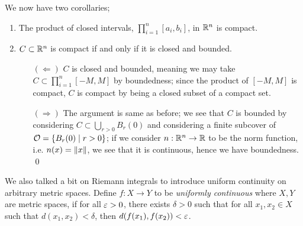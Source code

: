 We now have two corollaries;
\begin{enumerate}[label=(\alph*)]
    \item The product of closed intervals, $\prod_{i=1}^n [a_i, b_i]$, in $\mathbb R^n$ is compact.
    \item $C \subset \mathbb R^n$ is compact if and only if it is closed and bounded.
    \begin{itemize}
        \item[$(\Leftarrow)$] $C$ is closed and bounded, meaning we may take $C \subset \prod_{i=1}^n [-M, M]$ by boundedness; since the product of $[-M, M]$ is compact, $C$ is compact by being a closed subset of a compact set.
        \item[$(\Rightarrow)$] The argument is same as before; we see that $C$ is bounded by considering $C \subset \bigcup_{r > 0} B_r(0)$ and considering a finite subcover of $\mathcal O = \{B_r(0) \mid r > 0\}$; if we consider $n : \mathbb R^n \to \mathbb R$ to be the norm function, i.e. $n(x) = \left\lVert x \right\rVert$, we see that it is continuous, hence we have boundedness. \qed
    \end{itemize}
\end{enumerate}
We also talked a bit on Riemann integrals to introduce uniform continuity on arbitrary metric spaces. Define $f : X \to Y$ to be \textit{uniformly continuous} where $X, Y$ are metric spaces, if for all $\varepsilon > 0$, there exists $\delta > 0$ such that for all $x_1, x_2 \in X$ such that $d(x_1, x_2) < \delta$, then $d(f(x_1), f(x_2)) < \varepsilon$.